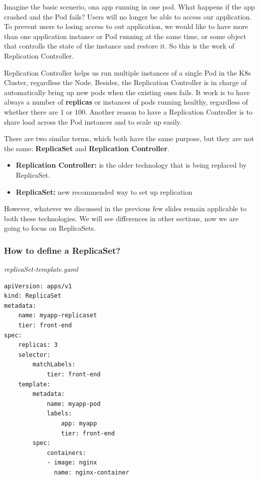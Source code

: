 \documentclass{article}
\newenvironment{blocktemplateIII}[1]{%
    \tcolorbox[beamer,%
    noparskip,breakable,
    ,colframe=Red,%
    colbacklower=LimeGreen!75!LightGreen,%
    title=#1]}%
    {\endtcolorbox}
\newenvironment{codetemplate}[1][]{%
  \mybasecolorbox[#1]
  \itshape
}{%
  \endmybasecolorbox
}
\begin{document}
Imagine the basic scenerio, ona app running in one pod. What happens if the app crashed and the Pod fails? Users will no longer be able to access our application. To prevent users to losing access to out application, we would like to have more than one application instance or Pod running at the same time, or some object that controlls the state of the instance and restore it. So this is the work of Replication Controller.

Replication Controller helps us run multiple instances of a single Pod in the K8s Cluster, regardless the Node. Besides, the Replication Controller is in charge of automatically bring up new pods when the existing ones fails. It work is to have always a number of \textbf{replicas} or instances of pods running healthy, regardless of whether there are 1 or 100. Another reason to have a Replication Controller is to share load across the Pod instances and to scale up easily.

\begin{blocktemplateIII}{Note}
There are two similar terms, which both have the same purpose, but they are not the same: \textbf{ReplicaSet} and \textbf{Replication Controller}.

\begin{itemize}
    \item \textbf{Replication Controller:} is the older technology that is being replaced by ReplicaSet.
    \item \textbf{ReplicaSet:} new recommended way to set up replication
\end{itemize}

However, whatever we discussed in the previous few slides remain applicable to both these technologies. We will see differences in other sections, now we are going to focus on ReplicaSets.
\end{blocktemplateIII}

\subsubsection{How to define a ReplicaSet?}

\begin{codetemplate}{replicaSet-template.yaml}
\begin{verbatim}
apiVersion: apps/v1
kind: ReplicaSet
metadata:
    name: myapp-replicaset
    tier: front-end
spec:
    replicas: 3
    selector:
        matchLabels:
            tier: front-end
    template:
        metadata:
            name: myapp-pod
            labels: 
                app: myapp
                tier: front-end
        spec:
            containers:
            - image: nginx
              name: nginx-container
\end{verbatim}
\end{codetemplate}
\end{document}
